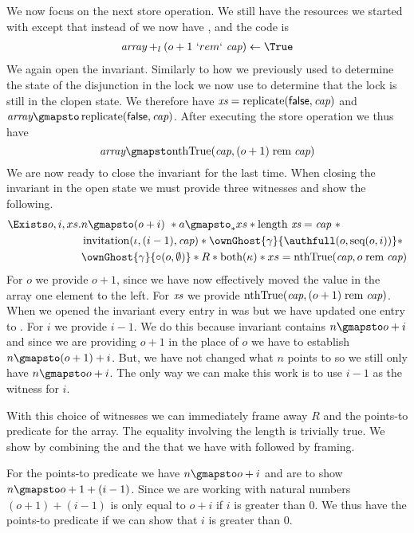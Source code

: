 We now focus on the next store operation. We still have the resources we started
with except that instead of \rightK we now have \leftK, and the code is
\begin{align*}
  \Array \plusl (o + 1\ `rem`\ \Cap) \gets \True
\end{align*}
We again open the invariant. Similarly to how we previously used \rightK to
determine the state of the disjunction in the lock we now use \leftK to
determine that the lock is still in the clopen state. We therefore have $\textit{xs} =
\operatorname{replicate}(\textsf{false}, \textit{cap})$ and $\Array \gmapsto \replicate(\false, \Cap)$. After
executing the store operation we thus have
\[
  \Array \gmapsto \nthTrue(\Cap, (o + 1) \Rem \Cap)
\]
We are now ready to close the invariant for the last time.
When closing the invariant in the open state we must provide three witnesses and show the following.
\begin{align*}
  \Exists o, i, xs. & n \gmapsto (o + i) \ \ast a \gmapsto_{*} xs \ast \length\ \xs = \Cap\ \ast \\
    & \invitation(\iota, (i - 1), \Cap) \ast \ownGhost{\gamma}{\authfull ( o, \seq(o, i))} \ast \\
    &  \ownGhost{\gamma}{\circ (o, \emptyset)} \ast R \ast \bothK \ast xs = \nthTrueCapO
\end{align*}
For $o$ we provide $o + 1$, since we have now effectively moved the \true{}
value in the array one element to the left. For $\textit{xs}$ we provide
$\text{nthTrue}(\textit{cap}, (o + 1) \;\mathrm{rem}\; \textit{cap})$. When we opened the invariant every entry in
\xs{} was \false{} but we have updated one entry to \true. For $i$ we provide
$i - 1$. We do this because invariant contains $n \gmapsto o + i$ and since we
are providing $o + 1$ in the place of $o$ we have to establish
$n \gmapsto (o + 1) + i$. But, we have not changed what $n$ points to so we
still only have $n \gmapsto o + i$. The only way we can make this work is to use
$i - 1$ as the witness for $i$.

With this choice of witnesses we can immediately frame away $R$ and the
points-to predicate for the array. The equality involving the length is
trivially true. We show \bothK{} by combining the \leftK{} and the \rightK{}
that we have with  followed by framing.

For the points-to predicate we have $n \gmapsto o + i$ and are to show
$n \gmapsto o + 1 + (i - 1)$. Since we are working with natural numbers
$(o + 1) + (i - 1)$ is only equal to $o + i$ if $i$ is greater than 0. We thus
have the points-to predicate if we can show that $i$ is greater than 0.

